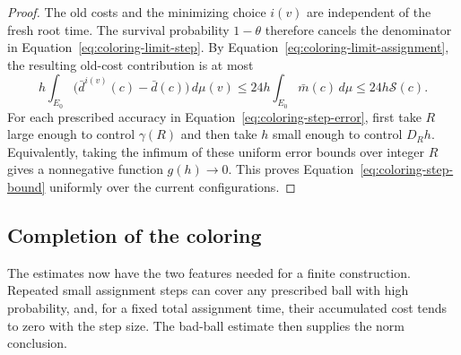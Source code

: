 \begin{proof}
The old costs and the minimizing choice $i(v)$ are independent of the
fresh root time.  The survival probability $1-\theta$ therefore cancels
the denominator in Equation~\eqref{eq:coloring-limit-step}.  By
Equation~\eqref{eq:coloring-limit-assignment}, the resulting old-cost
contribution is at most
\[
 h\int_{E_0}\bigl(\bar d^{i(v)}(c)-\bar d(c)\bigr)\,d\mu(v)
       \leq24h\int_{E_0}\bar m(c)\,d\mu
       \leq24h\mathcal S(c).
\]
For each prescribed accuracy in Equation~\eqref{eq:coloring-step-error},
first take $R$ large enough to control $\gamma(R)$ and then take $h$
small enough to control $D_Rh$.  Equivalently, taking the infimum of
these uniform error bounds over integer $R$ gives a nonnegative function
$g(h)\to0$.  This proves Equation~\eqref{eq:coloring-step-bound} uniformly
over the current configurations.
\end{proof}

\subsection{Completion of the coloring}

The estimates now have the two features needed for a finite construction.
Repeated small assignment steps can cover any prescribed ball with high
probability, and, for a fixed total assignment time, their accumulated
cost tends to zero with the step size.  The bad-ball estimate then supplies
the norm conclusion.

